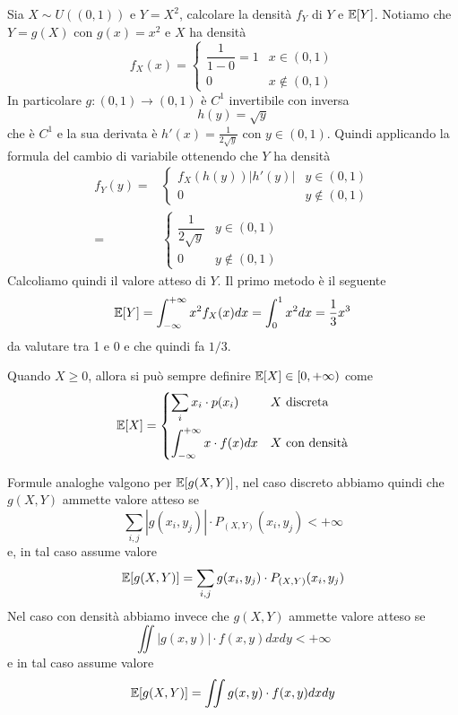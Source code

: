 \begin{example}
	Sia $X \sim U((0,1))$ e $Y = X^2$, calcolare la densità $f_Y$ di $Y$ e $\mathbb{E}[Y]$. Notiamo che
	$Y = g(X)$ con $g(x) = x^2$ e $X$ ha densità
	\[
		f_X(x) = \begin{cases}
			\dfrac{1}{1-0} = 1 & x \in (0,1)    \\
			0                  & x \notin (0,1)
		\end{cases}
	\]
	In particolare $g : (0,1) \to (0,1)$ è $C^1$ invertibile con inversa
	\[ h(y) = \sqrt{y} \]
	che è $C^1$ e la sua derivata è $h'(x) = \frac{1}{2 \sqrt{y}}$ con $y \in (0,1)$. Quindi
	applicando la formula del cambio di variabile ottenendo che $Y$ ha densità
	\begin{align*}
		f_Y (y) = & \begin{cases}
			            f_X (h(y)) |h'(y)| & y \in (0,1)    \\
			            0                  & y \notin (0,1)
		            \end{cases}                  \\
		=         & \begin{cases}
			            \dfrac{1}{2 \sqrt{y}} & y \in (0,1)    \\
			            0                     & y \notin (0,1)
		            \end{cases}
	\end{align*}
	Calcoliamo quindi il valore atteso di $Y$. Il primo metodo è il seguente
	\[ \mathbb{E}[Y] = \int_{-\infty}^{+\infty} x^2 f_X (x) dx = \int_0^1 x^2 dx = \frac{1}{3} x^3 \]
	da valutare tra 1 e 0 e che quindi fa $1/3$.
\end{example}

\begin{observation}
	Quando $X \geq 0$, allora si può sempre definire $\mathbb{E}[X] \in [0, +\infty)$ come
	\[
		\mathbb{E}[X] = \begin{cases}
			\displaystyle\sum_i x_i \cdot p(x_i)                  & X \text{ discreta}    \\[3ex]
			\displaystyle\int_{-\infty}^{+\infty} x \cdot f(x) dx & X \text{ con densità}
		\end{cases}
	\]
\end{observation}

\begin{observation}
	Formule analoghe valgono per $\mathbb{E}[g(X,Y)]$, nel caso discreto abbiamo quindi che $g(X, Y)$
	ammette valore atteso se
	\[ \sum_{i,j} |g(x_i, y_j)| \cdot P_{(X,Y)} (x_i, y_j) < +\infty \]
	e, in tal caso assume valore
	\[ \mathbb{E}[g(X,Y)] = \sum_{i,j} g(x_i, y_j) \cdot P_{(X,Y)} (x_i, y_j) \]
	Nel caso con densità abbiamo invece che $g(X,Y)$ ammette valore atteso se
	\[ \iint |g(x,y)| \cdot f (x,y) dx dy < +\infty \]
	e in tal caso assume valore
	\[ \mathbb{E}[g(X, Y)] = \iint g(x, y) \cdot f(x,y) dx dy \]
\end{observation}

